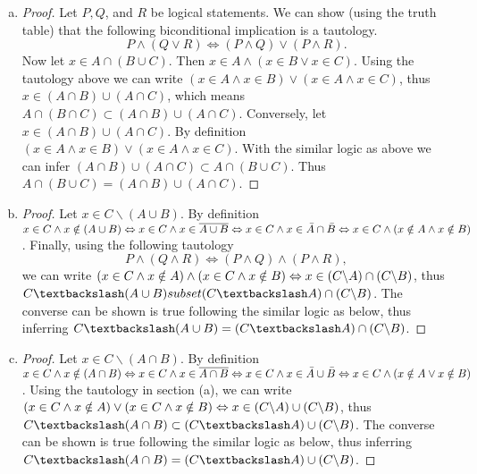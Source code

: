 \begin{ans}
	\begin{enumerate}[(a)]
		\item 
		\begin{proof}
			Let $P, Q$, and $R$ be logical statements. We can show (using the truth table) that the following biconditional implication is a tautology. \[ P \wedge (Q \vee R) \Leftrightarrow (P \wedge Q) \vee (P \wedge R). \]
			Now let $x \in A \cap (B \cup C)$. Then $x \in A \wedge (x \in B \vee x \in C)$. Using the tautology above we can write $(x \in A \wedge x \in B) \vee (x \in A \wedge x \in C)$, thus $x \in (A \cap B) \cup (A \cap C) $, which means $A \cap (B \cap C) \subset (A \cap B) \cup (A \cap C)$. Conversely, let $x \in (A \cap B) \cup (A \cap C)$. By definition $(x \in A \wedge x \in B) \vee (x \in A \wedge x \in C)$. With the similar logic as above we can infer $(A \cap B) \cup (A \cap C) \subset A \cap (B \cup C)$. Thus $A \cap (B \cup C) = (A \cap B) \cup (A \cap C)$.
		\end{proof}
		
		\item 
		\begin{proof}
			Let $x \in C \backslash (A \cup B)$. By definition $x \in C \wedge x \notin (A \cup B) \Leftrightarrow x \in C \wedge x \in \overline{A \cup B} \Leftrightarrow x \in C \wedge x \in \bar{A} \cap \bar{B} \Leftrightarrow x \in C \wedge (x \notin A \wedge x \notin B)$. Finally, using the following tautology 
			\[ P \wedge (Q \wedge R) \Leftrightarrow (P \wedge Q) \wedge (P \wedge R), \]
			we can write $(x \in C \wedge x \notin A) \wedge (x \in C \wedge x \notin B) \Leftrightarrow x \in (C \backslash A) \cap (C \backslash B) $, thus $C \textbackslash (A \cup B) subset (C \textbackslash A) \cap (C \backslash B)$. The converse can be shown is true following the similar logic as below, thus inferring $C \textbackslash (A \cup B) = (C \textbackslash A) \cap (C \backslash B)$.
		\end{proof}
		
		\item \begin{proof}
			Let $x \in C \backslash (A \cap B)$. By definition $x \in C \wedge x \notin (A \cap B) \Leftrightarrow x \in C \wedge x \in \overline{A \cap B} \Leftrightarrow x \in C \wedge x \in \bar{A} \cup \bar{B} \Leftrightarrow x \in C \wedge (x \notin A \vee x \notin B)$. Using the tautology in section (a),
			we can write $(x \in C \wedge x \notin A) \vee (x \in C \wedge x \notin B) \Leftrightarrow x \in (C \backslash A) \cup (C \backslash B) $, thus $C \textbackslash (A \cap B) \subset (C \textbackslash A) \cup (C \backslash B)$. The converse can be shown is true following the similar logic as below, thus inferring $C \textbackslash (A \cap B) = (C \textbackslash A) \cup (C \backslash B)$.
		\end{proof}
	\end{enumerate}
\end{ans}
\newpage

